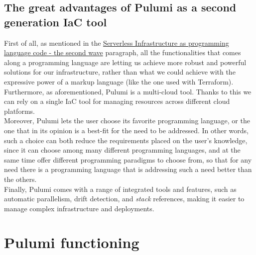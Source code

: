 \subsection{The great advantages of Pulumi as a second generation IaC tool}
First of all, as mentioned in the \hyperref[sssec:second-wave]{Serverless Infrastructure as programming language code - the second wave} paragraph, all the functionalities that comes along a programming language are letting us achieve more robust and powerful solutions for our infrastructure, rather than what we could achieve with the expressive power of a markup language (like the one used with \gls{Terraform}).\\
Furthermore, as aforementioned, Pulumi is a multi-cloud tool. Thanks to this we can rely on a single IaC tool for managing resources across different cloud platforms.\\
Moreover, Pulumi lets the user choose its favorite programming language, or the one that in its opinion is a best-fit for the need to be addressed.
In other words, such a choice can both reduce the requirements placed on the user's knowledge, since it can choose among many different programming languages, 
and at the same time offer different programming paradigms to choose from, so that for any need there is a programming language that is addressing such a need better than the others.\\
Finally, Pulumi comes with a range of integrated tools and features, such as automatic parallelism, drift detection, and \textit{stack} references, making it easier to manage complex infrastructure and deployments.

\section{Pulumi functioning}
\label{sec:pulumi-functioning}

